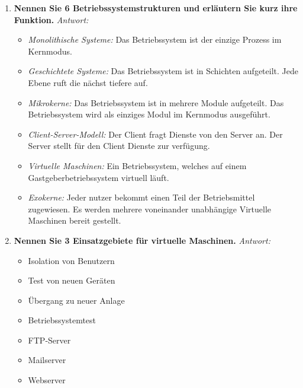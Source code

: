 \begin{enumerate}[label=\arabic*.]
    \item \textbf{Nennen Sie 6 Betriebssystemstrukturen und erläutern Sie \newline kurz ihre Funktion.} \newline
          \textit{Antwort:} \begin{itemize}
              \item \textit{Monolithische Systeme:} Das Betriebssystem ist der einzige Prozess im Kernmodus.
              \item \textit{Geschichtete Systeme:} Das Betriebssystem ist in Schichten aufgeteilt. Jede Ebene ruft
                    die nächst tiefere auf.
              \item \textit{Mikrokerne:} Das Betriebssystem ist in mehrere Module aufgeteilt. Das Betriebssystem wird
                    als einziges Modul im Kernmodus ausgeführt.
              \item \textit{Client-Server-Modell:} Der Client fragt Dienste von den Server an. Der Server stellt
                    für den Client Dienste zur verfügung.
              \item \textit{Virtuelle Maschinen:} Ein Betriebssystem, welches auf einem Gastgeberbetriebssystem
                    virtuell läuft.
              \item \textit{Exokerne:} Jeder nutzer bekommt einen Teil der Betriebsmittel zugewiesen. Es werden
                    mehrere voneinander unabhängige Virtuelle Maschinen bereit gestellt.
          \end{itemize}

    \item \textbf{Nennen Sie 3 Einsatzgebiete für virtuelle Maschinen.} \newline
          \textit{Antwort:} \begin{itemize}
              \item Isolation von Benutzern
              \item Test von neuen Geräten
              \item Übergang zu neuer Anlage
              \item Betriebssystemtest
              \item FTP-Server
              \item Mailserver
              \item Webserver
          \end{itemize}


\end{enumerate}
